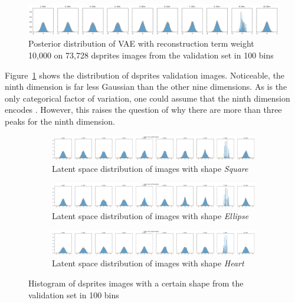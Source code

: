 \begin{figure}
    \centering
    \includegraphics[width=\textwidth]{images/latent_space_entanglement/vae_dsprites_lf_10000_dist.png}
    \caption[VAE Latent Space Distribution - dsprites]{Posterior distribution of \ac{VAE} with reconstruction term weight 10,000 on 73,728 dsprites images from the validation set in 100 bins}
    \label{fig:10000_vae_latent_space_distribution}
\end{figure}

Figure~\ref{fig:10000_vae_latent_space_distribution} shows the distribution of dsprites validation images.
Noticeable, the ninth dimension is far less Gaussian than the other nine dimensions.
As  is the only categorical factor of variation, one could assume that the ninth dimension encodes .
However, this raises the question of why there are more than three peaks for the ninth dimension.

\begin{figure}
    \centering
    \begin{subfigure}{\textwidth}
        \centering
        \includegraphics[width=\textwidth]{images/latent_space_entanglement/vae_dsprites_lf_10000_dist_shape_1.png}
        \caption{Latent space distribution of images with shape \textit{Square}}
    \end{subfigure}
    \begin{subfigure}{\textwidth}
        \centering
        \includegraphics[width=\textwidth]{images/latent_space_entanglement/vae_dsprites_lf_10000_dist_shape_2.png}
        \caption{Latent space distribution of images with shape \textit{Ellipse}}
    \end{subfigure}
    \begin{subfigure}{\textwidth}
        \centering
        \includegraphics[width=\textwidth]{images/latent_space_entanglement/vae_dsprites_lf_10000_dist_shape_3.png}
        \caption{Latent space distribution of images with shape \textit{Heart}}
    \end{subfigure}
    \caption[VAE Latent Space Distribution - dsprites Shapes]{Histogram of dsprites images with a certain shape from the validation set in 100 bins}
    \label{fig:10000_vae_latent_space_distribution_shapes}
\end{figure}

